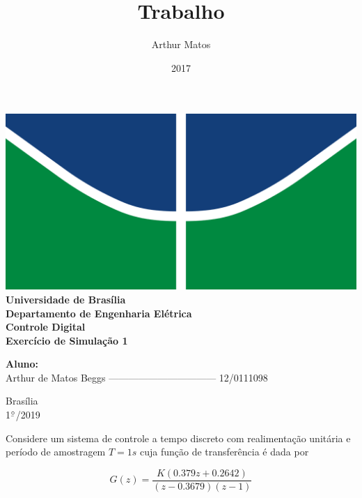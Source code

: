 \documentclass{article}
\title{Trabalho}
\author{Arthur Matos}
\date{2017}
\newcommand{\ubar}[1]{\underaccent{\bar}{#1}}
\begin{document}
\begin{titlepage}
    \begin{center}
        \centering
        \includegraphics[width=.7\linewidth]{images/logo_unb.png}\\[0.5cm]
        {\large \textbf{Universidade de Brasília}}\\[0.2cm]
        {\large \textbf{Departamento de Engenharia Elétrica}}\\[0.2cm]
        {\large \textbf{Controle Digital}}\\[4.8cm]
        {\bf \huge {Exercício de Simulação 1}}\\[0.2cm]
        {\bf \large {}}
    \end{center}

    \vspace{5cm}
    \hspace{2cm} {\noindent \bf \large {Aluno:}}\\
    \vspace{0.8cm}
    \hspace{2.35cm} {\large Arthur de Matos Beggs --------------------------------- 12/0111098}\\[1cm]

    \begin{center}
        {\large Brasília}\\
        {\large 1$^{\ubar{\circ}}$/2019}
    \end{center}

\end{titlepage}
\clearpage
\setcounter{page}{2}
\clearpage



{\Large \bf {
    Considere um sistema de controle a tempo discreto com realimentação
    unitária e período de amostragem $ T = 1s $ cuja função de transferência é
    dada por

    \[ G(z) = \frac{K(0.379z + 0.2642)}{(z-0.3679)(z-1)} \]
}}
\end{document}
